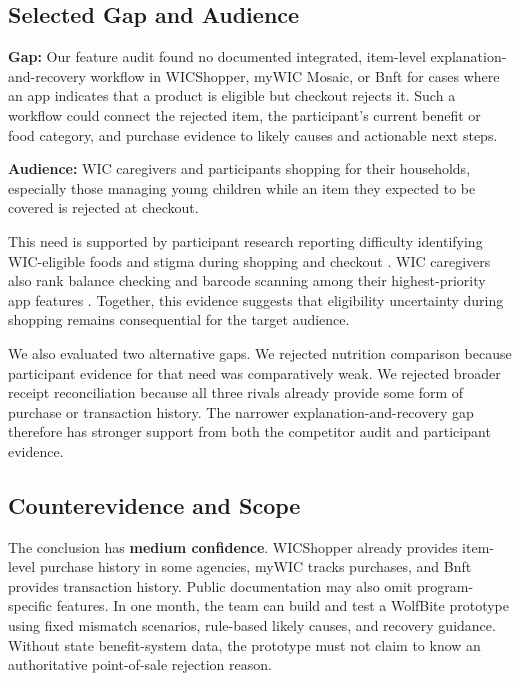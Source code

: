 \documentclass[sigconf]{acmart}
\begin{document}
\subsection{Selected Gap and Audience}

\textbf{Gap:} Our feature audit found no documented integrated, item-level
explanation-and-recovery workflow in WICShopper, myWIC Mosaic, or Bnft for
cases where an app indicates that a product is eligible but checkout rejects
it. Such a workflow could connect the rejected item, the participant's current
benefit or food category, and purchase evidence to likely causes and
actionable next steps.

\textbf{Audience:} WIC caregivers and participants shopping for their
households, especially those managing young children while an item they
expected to be covered is rejected at checkout.

This need is supported by participant research reporting difficulty
identifying WIC-eligible foods and stigma during shopping and checkout
\cite{fiedler2026,chauvenet2019}. WIC caregivers also rank balance checking and
barcode scanning among their highest-priority app features \cite{weber2021}.
Together, this evidence suggests that eligibility uncertainty during shopping
remains consequential for the target audience.

We also evaluated two alternative gaps. We rejected nutrition comparison
because participant evidence for that need was comparatively weak. We rejected
broader receipt reconciliation because all three rivals already provide some
form of purchase or transaction history. The narrower explanation-and-recovery
gap therefore has stronger support from both the competitor audit and
participant evidence.

\subsection{Counterevidence and Scope}

The conclusion has \textbf{medium confidence}. WICShopper already provides
item-level purchase history in some agencies, myWIC tracks purchases, and Bnft
provides transaction history. Public documentation may also omit
program-specific features. In one month, the team can build and test a
WolfBite prototype using fixed mismatch scenarios, rule-based likely causes,
and recovery guidance. Without state benefit-system data, the prototype must
not claim to know an authoritative point-of-sale rejection reason.
\end{document}
